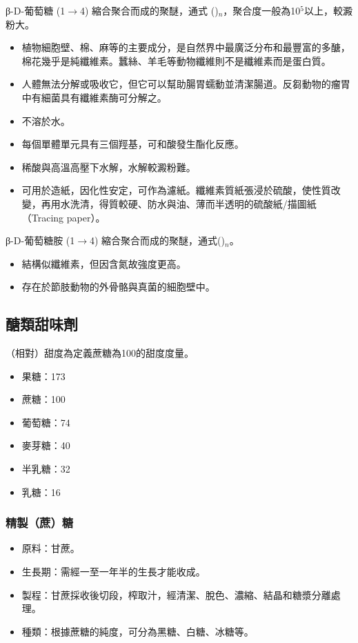 \documentclass[a4paper,12pt]{report}
\begin{document}
\begin{itemize}
\begin{itemize}
β-D-葡萄糖 (1$\to$4) 縮合聚合而成的聚醚，通式 ()$_n$，聚合度一般為10$^5$以上，較澱粉大。
\begin{itemize}
\item 植物細胞壁、棉、麻等的主要成分，是自然界中最廣泛分布和最豐富的多醣，棉花幾乎是純纖維素。蠶絲、羊毛等動物纖維則不是纖維素而是蛋白質。
\item 人體無法分解或吸收它，但它可以幫助腸胃蠕動並清潔腸道。反芻動物的瘤胃中有細菌具有纖維素酶可分解之。
\item 不溶於水。
\item 每個單體單元具有三個羥基，可和酸發生酯化反應。
\item 稀酸與高溫高壓下水解，水解較澱粉難。
\item 可用於造紙，因化性安定，可作為濾紙。纖維素質紙張浸於硫酸，使性質改變，再用水洗清，得質較硬、防水與油、薄而半透明的硫酸紙/描圖紙（Tracing paper）。
\end{itemize}
β-D-葡萄糖胺 (1$\to$4) 縮合聚合而成的聚醚，通式()$_n$。
\begin{itemize}
\item 結構似纖維素，但因含氮故強度更高。
\item 存在於節肢動物的外骨骼與真菌的細胞壁中。
\end{itemize}
\subsection{醣類甜味劑}
（相對）甜度為定義蔗糖為100的甜度度量。
\begin{itemize}
\item 果糖：173
\item 蔗糖：100
\item 葡萄糖：74
\item 麥芽糖：40
\item 半乳糖：32
\item 乳糖：16
\end{itemize}
\subsubsection{精製（蔗）糖}
\begin{itemize}
\item 原料：甘蔗。
\item 生長期：需經一至一年半的生長才能收成。
\item 製程：甘蔗採收後切段，榨取汁，經清潔、脫色、濃縮、結晶和糖漿分離處理。
\item 種類：根據蔗糖的純度，可分為黑糖、白糖、冰糖等。
\end{itemize}

\end{itemize}
\end{itemize}
\end{document}
